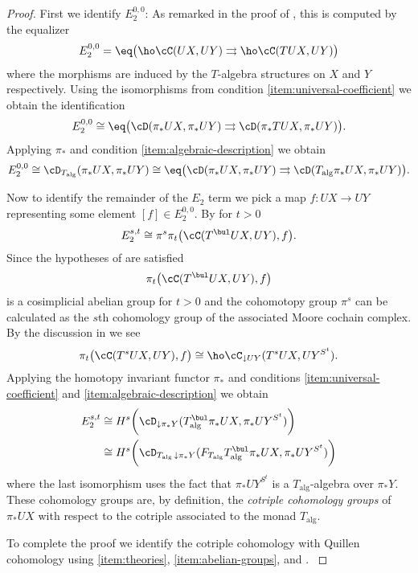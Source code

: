 \documentclass[leqno,oneside,english]{elsarticle}
\begin{document}
\begin{proof}
First we identify $E_2^{0,0}$: As remarked in the proof of , this is computed by the equalizer
\[ 
E_2^{0,0} = \eq\big(\ho \cC(UX,UY)\rightrightarrows
\ho \cC(TUX,UY)\big)
\] 
where the
morphisms are induced by the $T$-algebra structures on $X$
and $Y$ respectively. Using the isomorphisms from condition
\eqref{item:universal-coefficient} we obtain the identification
\[ 
E_2^{0,0}\cong \eq\big(\cD(\pi_*UX,\pi_*UY)\rightrightarrows
\cD(\pi_*TUX,\pi_*UY)\big).
\] 
Applying  $\pi_*$ and
condition \eqref{item:algebraic-description} we obtain
\[ 
E_2^{0,0}\cong
\cD_{T_{\mathrm{alg}}}(\pi_*UX,\pi_*UY)\cong
\eq\big(\cD(\pi_*UX,\pi_*UY)\rightrightarrows
\cD(T_{\mathrm{alg}}\pi_*UX,\pi_*UY)\big).
\] 

Now to identify the remainder of the $E_2$ term we pick a map $f\colon
UX\rightarrow UY$ representing some element $[f]\in
E_2^{0,0}$. By  for $t>0$ 
\[
E_2^{s,t} \cong
\pi^{s}\pi_t\big(\cC(T^{\bul}UX,UY),f\big).
\] 
Since the hypotheses of  are satisfied
\[
\pi_t\big(\cC(T^{\bul}UX,UY),f\big)
\] 
is a cosimplicial abelian group for $t>0$ and the cohomotopy group
$\pi^s$ can be calculated as the $s$th cohomology group of the
associated Moore cochain complex. By the discussion in
 we see
\[ 
\pi_t\big(\cC(T^{s}UX, UY),f\big)\cong 
\ho\cC_{\downarrow UY}(T^{s}UX,UY^{S^t}). 
\] 
Applying the homotopy invariant functor $\pi_*$ and conditions
\eqref{item:universal-coefficient} and
\eqref{item:algebraic-description} we obtain
\begin{align*} 
  E_2^{s,t} & \cong H^s \bigg(
  \cD_{\downarrow \pi_*Y}(T_{\mathrm{alg}}^\bul \pi_*UX,\pi_*UY^{S^t})
  \bigg)\\
  & \cong H^s \bigg(
  \cD_{T_{\mathrm{alg}} \, \downarrow \pi_*Y}(F_{T_{\mathrm{alg}}}T_{\mathrm{alg}}^\bul \pi_*UX, \pi_*UY^{S^t})
  \bigg)
\end{align*}
where the last isomorphism uses the fact that $\pi_* UY^{S^t}$ is a $T_{\mathrm{alg}}$-algebra
over $\pi_* Y$.  These cohomology groups are, by definition, the
\emph{cotriple cohomology groups} of $\pi_*UX$ with respect to the
cotriple associated to the monad $T_{\mathrm{alg}}$.

To complete the proof we identify the cotriple cohomology with 
Quillen cohomology using \eqref{item:theories}, \eqref{item:abelian-groups}, and \cite[\S~II.5 Thm.~5]{Qui67}. 
{{\ifshowsaveblocks
{}}}
\end{proof}
\end{document}
